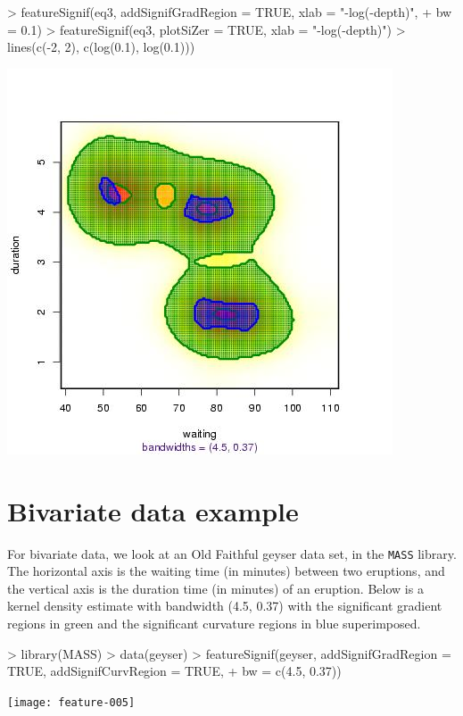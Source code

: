 \documentclass[a4paper,11pt]{article}
\begin{document}
\begin{Schunk}
\begin{Sinput}
> featureSignif(eq3, addSignifGradRegion = TRUE, xlab = "-log(-depth)", 
+     bw = 0.1)
> featureSignif(eq3, plotSiZer = TRUE, xlab = "-log(-depth)")
> lines(c(-2, 2), c(log(0.1), log(0.1)))
\end{Sinput}
\end{Schunk}
\begin{center}
\includegraphics{feature-003}
\end{center}

\section{Bivariate data example}

For bivariate data, we look at an Old Faithful geyser data set,
in the \texttt{MASS} library. The
horizontal axis is the waiting time (in minutes) between two eruptions, and
the vertical axis is the duration time (in minutes) of an eruption.
Below is a kernel density estimate with
bandwidth (4.5, 0.37) with the significant gradient regions in green
and the significant curvature regions in blue superimposed.
\begin{center}
\begin{Schunk}
\begin{Sinput}
> library(MASS)
> data(geyser)
> featureSignif(geyser, addSignifGradRegion = TRUE, addSignifCurvRegion = TRUE, 
+     bw = c(4.5, 0.37))
\end{Sinput}
\end{Schunk}
\texttt{[image: feature-005]}
\end{center}
\end{document}
